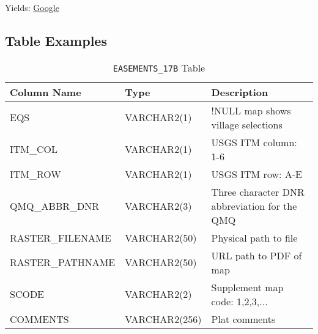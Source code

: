 \documentclass[12pt,letterpaper,dvips]{article}
\newcommand{\cmd}[1]{\texttt{#1}}
\begin{document}
\noindent Yields: \href{http://www.google.com}{Google}


\subsection{Table Examples}
\begin{table}[htb]
\begin{tabular}{|p{}|p{}|p{}|}\hline 
Column Name&Type&Description\\ 
\hline
EQS&VARCHAR2(1)&!NULL map shows village selections\\
ITM\_COL&VARCHAR2(1)&USGS ITM column: 1-6\\
ITM\_ROW&VARCHAR2(1)&USGS ITM row: A-E\\
QMQ\_ABBR\_DNR&VARCHAR2(3)&Three character DNR abbreviation for the QMQ\\
RASTER\_FILENAME&VARCHAR2(50)&Physical path to file\\
RASTER\_PATHNAME&VARCHAR2(50)&URL path to PDF of map\\
SCODE&VARCHAR2(2)&Supplement map code: 1,2,3,...\\
COMMENTS&VARCHAR2(256)&Plat comments\\
\hline
\end{tabular}
\caption {\cmd{EASEMENTS\_17B} Table}
\label{table:easements_17b}
\end{table}
\end{document}

